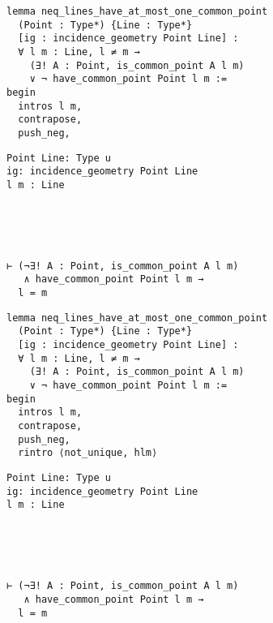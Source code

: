 \begin{frame}[fragile]
	\begin{multicols}{2}
		\begin{lstlisting}
lemma neq_lines_have_at_most_one_common_point 
  (Point : Type*) {Line : Type*} 
  [ig : incidence_geometry Point Line] :
  ∀ l m : Line, l ≠ m → 
    (∃! A : Point, is_common_point A l m) 
    ∨ ¬ have_common_point Point l m := 
begin
  intros l m,
  contrapose,
  push_neg,
\end{lstlisting}
		\columnbreak
		\begin{lstlisting}
Point Line: Type u
ig: incidence_geometry Point Line
l m : Line





⊢ (¬∃! A : Point, is_common_point A l m) 
   ∧ have_common_point Point l m → 
  l = m
		\end{lstlisting}
	\end{multicols}
\end{frame}










\begin{frame}[fragile]
	\begin{multicols}{2}
		\begin{lstlisting}
lemma neq_lines_have_at_most_one_common_point 
  (Point : Type*) {Line : Type*} 
  [ig : incidence_geometry Point Line] :
  ∀ l m : Line, l ≠ m → 
    (∃! A : Point, is_common_point A l m) 
    ∨ ¬ have_common_point Point l m := 
begin
  intros l m,
  contrapose,
  push_neg,
  rintro ⟨not_unique, hlm⟩
\end{lstlisting}
		\columnbreak
		\begin{lstlisting}
Point Line: Type u
ig: incidence_geometry Point Line
l m : Line





⊢ (¬∃! A : Point, is_common_point A l m) 
   ∧ have_common_point Point l m → 
  l = m
		\end{lstlisting}
	\end{multicols}
\end{frame}










